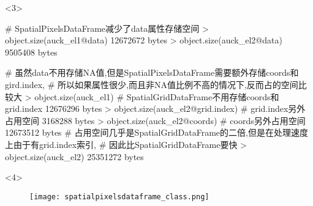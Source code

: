 \begin{frame}[t,fragile]{\subsecname}{\subsubsecname}
\begin{overlayarea}{\textwidth}{\textheight}
\begin{onlyenv}<3>
\begin{rcode}
# SpatialPixelsDataFrame减少了data属性存储空间
> object.size(auck_el1@data)
12672672 bytes
> object.size(auck_el2@data)
9505408 bytes

# 虽然data不用存储NA值,但是SpatialPixelsDataFrame需要额外存储coords和gird.index,
# 所以如果属性很少,而且非NA值比例不高的情况下,反而占的空间比较大
> object.size(auck_el1) # SpatialGridDataFrame不用存储coords和grid.index
12676296 bytes
> object.size(auck_el2@grid.index) # grid.index另外占用空间
3168288 bytes
> object.size(auck_el2@coords) # coords另外占用空间
12673512 bytes
# 占用空间几乎是SpatialGridDataFrame的二倍,但是在处理速度上由于有grid.index索引,
# 因此比SpatialGridDataFrame要快
> object.size(auck_el2) 
25351272 bytes
\end{rcode}
\end{onlyenv}

\begin{onlyenv}<4>
\begin{figure}[ht] \vspace{-20pt}
  \texttt{[image: spatialpixelsdataframe\_class.png]}
\end{figure}
\end{onlyenv}
\end{overlayarea}
\end{frame}

